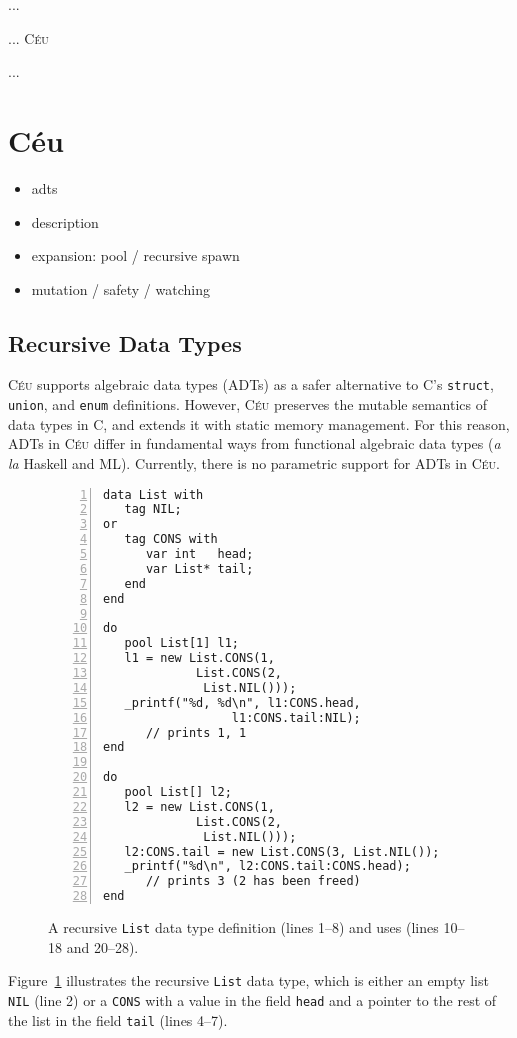 \documentclass{acm_proc_article-sp}
\newcommand{\CEU}{\textsc{C\'{e}u}\xspace}
\newcommand{\code}[1] {{\small{\texttt{#1}}}}
\begin{document}
...

... \CEU~\cite{ceu.sensys13,ceu.mod15}

...

\section{C\'eu}

\begin{itemize}
\item adts
\item description
\item expansion: pool / recursive spawn
\item mutation / safety / watching
\end{itemize}

\subsection{Recursive Data Types}

\CEU supports algebraic data types (ADTs) as a safer alternative to C's 
\code{struct}, \code{union}, and \code{enum} definitions.
However, \CEU preserves the mutable semantics of data types in C, and extends 
it with static memory management.
For this reason, ADTs in \CEU differ in fundamental ways from functional 
algebraic data types (\emph{a la} Haskell and ML).
Currently, there is no parametric support for ADTs in \CEU.

\begin{figure}[t]
\begin{lstlisting}[numbers=left,xleftmargin=3em]
data List with
   tag NIL;
or
   tag CONS with
      var int   head;
      var List* tail;
   end
end

do
   pool List[1] l1;
   l1 = new List.CONS(1,
             List.CONS(2,
              List.NIL()));
   _printf("%d, %d\n", l1:CONS.head,
                  l1:CONS.tail:NIL);
      // prints 1, 1
end

do
   pool List[] l2;
   l2 = new List.CONS(1,
             List.CONS(2,
              List.NIL()));
   l2:CONS.tail = new List.CONS(3, List.NIL());
   _printf("%d\n", l2:CONS.tail:CONS.head);
      // prints 3 (2 has been freed)
end
\end{lstlisting}
\caption{
A recursive \code{List} data type definition (lines 1--8) and uses (lines 
10--18 and 20--28).
\label{lst.data.list}
}
\end{figure}

Figure~\ref{lst.data.list} illustrates the recursive \code{List} data type, 
which is either an empty list \code{NIL} (line 2) or a \code{CONS} with a value 
in the field \code{head} and a pointer to the rest of the list in the field 
\code{tail} (lines 4--7).
\end{document}
